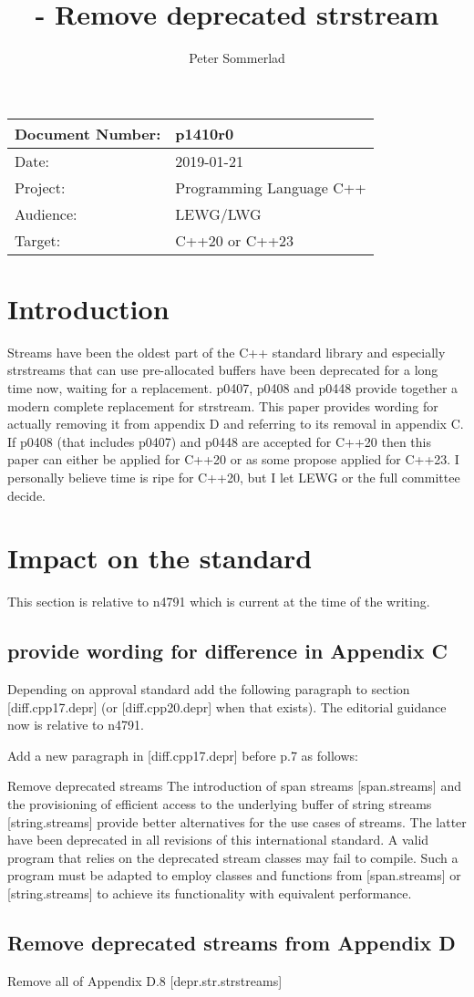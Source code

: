 \documentclass[ebook,11pt,article]{memoir}
\title{\papernumber{} - Remove deprecated strstream}
\author{Peter Sommerlad}
\date{\paperdate}                %
\newcommand{\papernumber}{p1410r0}
\newcommand{\paperdate}{2019-01-21}
\begin{document}
\maketitle
\begin{center}
\begin{tabular}[t]{|l|l|}\hline 
Document Number:&  \papernumber \hfill \\\hline
Date: & \paperdate \\\hline
Project: & Programming Language C++\\\hline 
Audience: & LEWG/LWG\\\hline
Target: & C++20 or C++23\\\hline
\end{tabular}
\end{center}
\section{Introduction}
Streams have been the oldest part of the C++ standard library and especially strstreams that can use pre-allocated buffers have been deprecated for a long time now, waiting for a replacement. p0407, p0408 and p0448 provide together a modern complete replacement for strstream. This paper provides wording for actually removing it from appendix D and referring to its removal in appendix C. If p0408 (that includes p0407) and p0448 are accepted for C++20 then this paper can either be applied for C++20 or as some propose applied for C++23. I personally believe time is ripe for C++20, but I let LEWG or the full committee decide.

\section{Impact on the standard}
This section is relative to n4791 which is current at the time of the writing.

\subsection{provide wording for difference in Appendix C}
Depending on approval standard add the following paragraph to section [diff.cpp17.depr] (or [diff.cpp20.depr] when that exists). The editorial guidance now is relative to n4791.

Add a new paragraph in [diff.cpp17.depr] before p.7 as follows:

\nodiffref
\change Remove deprecated  streams 
\rationale
The introduction of span streams [span.streams] and the provisioning of efficient access to the underlying buffer of string streams [string.streams] provide better alternatives for the use cases of  streams. The latter have been deprecated in all revisions of this international standard.
\effect
A valid \CppXVII{} program that relies on the deprecated  stream classes may fail to compile. Such a program must be adapted to employ classes and functions from [span.streams] or [string.streams] to achieve its functionality with equivalent performance.

\subsection{Remove deprecated  streams from Appendix D}
Remove all of Appendix D.8  [depr.str.strstreams]
\end{document}
